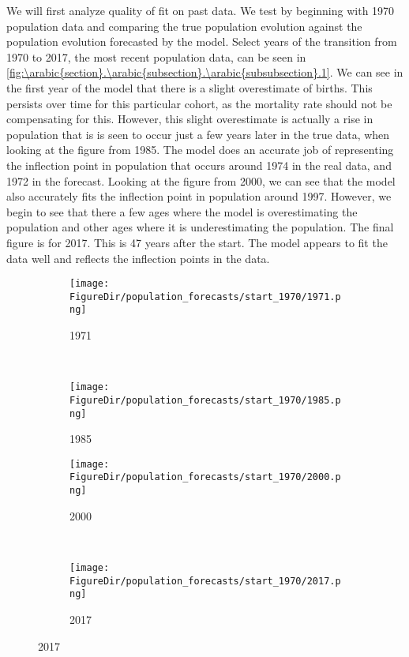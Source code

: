 \documentclass[10pt]{article}
\renewcommand{\thesection}{\arabic{section}}
\renewcommand{\thesubsection}{\thesection.\arabic{subsection}}
\renewcommand{\thesubsubsection}{\thesubsection.\arabic{subsubsection}}
\numberwithin{equation}{subsection}
\newcommand*{\FigureDir}{../../graphs}
\begin{document}
\par We will first analyze quality of fit on past data. We test by beginning with 1970 population data and comparing the true population evolution against the population evolution forecasted by the model. Select years of the transition from 1970 to 2017, the most recent population data, can be seen in \autoref{fig:\thesubsubsection.1}. We can see in the first year of the model that there is a slight overestimate of births. This persists over time for this particular cohort, as the mortality rate should not be compensating for this. However, this slight overestimate is actually a rise in population that is is seen to occur just a few years later in the true data, when looking at the figure from 1985. The model does an accurate job of representing the inflection point in population that occurs around 1974 in the real data, and 1972 in the forecast. Looking at the figure from 2000, we can see that the model also accurately fits the inflection point in population around 1997. However, we begin to see that there a few ages where the model is overestimating the population and other ages where it is underestimating the population. The final figure is for 2017. This is 47 years after the start. The model appears to fit the data well and reflects the inflection points in the data. 

\begin{figure}[!ht]
   \centering
   \caption{\label{fig:\thesubsubsection.1}Forecasted Versus True Population Initial Population Set to 1970}
   \begin{subfigure}{0.5\textwidth}
      \centering
      \texttt{[image: \\FigureDir/population\_forecasts/start\_1970/1971.png]}
      \caption{1971}
   \end{subfigure}%
   ~ %
   \begin{subfigure}{0.5\textwidth}
      \centering
      \texttt{[image: \\FigureDir/population\_forecasts/start\_1970/1985.png]}
      \caption{1985}
   \end{subfigure}%
   \newline
   \begin{subfigure}{0.5\textwidth}
      \centering
      \texttt{[image: \\FigureDir/population\_forecasts/start\_1970/2000.png]}
      \caption{2000}
   \end{subfigure}%
   ~ %
   \begin{subfigure}{0.5\textwidth}
      \centering
      \texttt{[image: \\FigureDir/population\_forecasts/start\_1970/2017.png]}
      \caption{2017}
   \end{subfigure}%
\end{figure}
\end{document}
